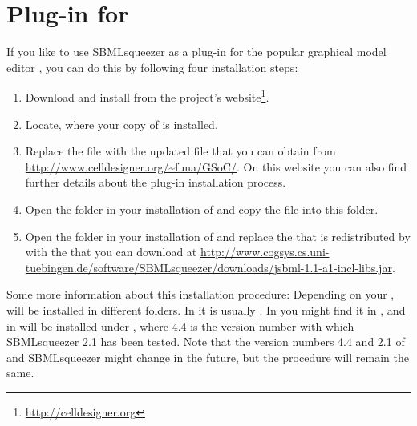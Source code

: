 \section{Plug-in for \CellDesigner}
\label{sec:CellDesignerInstall}

If you like to use SBMLsqueezer as a plug-in for the popular graphical model
editor \CellDesigner \citep{Funahashi2003, Funahashi2006, Funahashi2007a, Funahashi2008}, you can do this by following four installation steps:
\begin{enumerate}
  \item Download and install \CellDesigner from the project's website\footnote{\url{http://celldesigner.org}}.
  \item Locate, where your copy of \CellDesigner is installed.
  \item Replace the file  with the updated file  that you can obtain from \url{http://www.celldesigner.org/~funa/GSoC/}. On this website you can also find further details about the plug-in installation process.
  \item Open the  folder in your installation of \CellDesigner and
        copy the file \href{http://www.cogsys.cs.uni-tuebingen.de/software/SBMLsqueezer/downloads/SBMLsqueezer_v2.1.jar}{} into this folder.
  \item Open the  folder in your installation of \CellDesigner and
        replace the \JSBML \JAR that is redistributed by \CellDesigner with
        the \JAR that you can download at \href{http://www.cogsys.cs.uni-tuebingen.de/software/SBMLsqueezer/downloads/jsbml-1.1-a1-incl-libs.jar}{\url{http://www.cogsys.cs.uni-tuebingen.de/software/SBMLsqueezer/downloads/jsbml-1.1-a1-incl-libs.jar}}.
\end{enumerate}
Some more information about this installation procedure:
Depending on your \OS, \CellDesigner will be installed in different folders.
In \Windows it is usually
.
In \Linux you might find it in , and in \MacOSX \CellDesigner will be installed under
, where 4.4 is the version number with which SBMLsqueezer 2.1 has been tested.
Note that the version numbers 4.4 and 2.1 of \CellDesigner and SBMLsqueezer might change in the future, but the procedure will remain the same.

